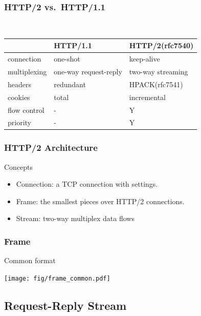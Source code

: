 \documentclass[lualatex]{beamer}
\begin{document}
\begin{frame}
  \frametitle{HTTP/2 vs.\ HTTP/1.1}

  \begin{block}{~}
    \begin{center}
      \begin{tabular}{|l|l|l|}
        \hline
        ~& HTTP/1.1 & HTTP/2(rfc7540)\\
        \hline
        connection & one-shot & keep-alive\\
        multiplexing & one-way request-reply & two-way streaming\\
        headers & redundant & HPACK(rfc7541)\\
        cookies & total & incremental\\
        flow control & - & Y\\
        priority & - & Y\\
        \hline
      \end{tabular}
    \end{center}
  \end{block}
\end{frame}

\begin{frame}
  \frametitle{HTTP/2 Architecture}

  \begin{block}{Concepts}
    \begin{itemize}
    \item Connection: a TCP connection with settings.
    \item Frame: the smallest pieces over HTTP/2 connections.
    \item Stream: two-way multiplex data flows
    \end{itemize}
  \end{block}
\end{frame}

\begin{frame}
  \frametitle{Frame}
  \begin{block}{Common format}
    \begin{center}
      \texttt{[image: fig/frame\_common.pdf]}
    \end{center}
  \end{block}
\end{frame}

\subsection{Request-Reply Stream}
\end{document}
